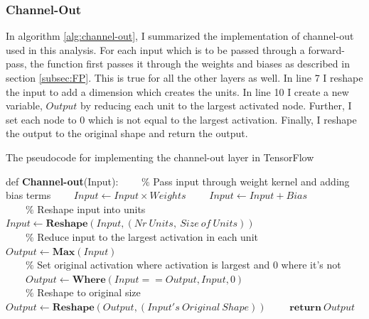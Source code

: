 \subsubsection*{Channel-Out}
In algorithm \ref{alg:channel-out}, I summarized the implementation of channel-out used in this analysis. For each 
input which is to be passed through a forward-pass, the function first passes it through the weights and biases 
as described in section \ref{subsec:FP}. This is true for all the other layers as well. In line 7 I reshape the input 
to add a dimension which creates the units. In line 10 I create a new variable, $Output$ by reducing each unit to the 
largest activated node. Further, I set each node to 0 which is not equal to the largest activation. Finally, I reshape 
the output to the original shape and return the output.  
\begin{algorithm}
    \caption{The pseudocode for implementing the channel-out layer in TensorFlow}\label{alg:channel-out}
    \begin{algorithmic}[1]
    \State def \textbf{Channel-out}(Input): 
    \State \ \ \ \ $\%$ Pass input through weight kernel and adding bias terms
    \State \ \ \ \ $Input \gets Input \times Weights$
    \State \ \ \ \ $Input \gets Input + Bias$
    \\
    \State \ \ \ \ $\%$ Reshape input into units
    \State \ \ \ \ $Input \gets \textbf{Reshape}(Input,(Nr\ Units,\ Size \ of \ Units))$
    \\
    \State \ \ \ \ $\%$ Reduce input to the largest activation in each unit
    \State \ \ \ \ $Output \gets \textbf{Max}(Input)$
    \\
    \State \ \ \ \ $\%$ Set original activation where activation is largest and 0 where it's not
    \State \ \ \ \ $Output \gets \textbf{Where}(Input == Output, Input,0)$
    \\
    \State \ \ \ \ $\%$ Reshape to original size
    \State \ \ \ \ $Output \gets \textbf{Reshape}(Output,(Input's \ Original \ Shape))$
    \State \ \ \ \ $\textbf{return}\ Output$
    \end{algorithmic}
\end{algorithm}

